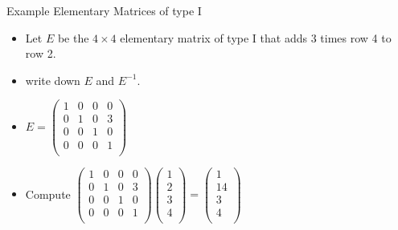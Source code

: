\documentclass{beamer}
\begin{document}
\begin{frame}{Example Elementary Matrices of type I}

\begin{itemize}
\item Let $E$ be the $4\times 4$ elementary matrix of type I that adds 3 times row 4 to row 2.
\item write down $E$ and $E^{-1}$.
\item
$
E=
\begin{pmatrix}
1 & 0 & 0 & 0 \\
0 & 1 & 0 & 3 \\
0 & 0 & 1 & 0 \\
0 & 0 & 0 & 1 \\
\end{pmatrix}
$
\item
Compute
$
\begin{pmatrix}
1 & 0 & 0 & 0 \\
0 & 1 & 0 & 3 \\
0 & 0 & 1 & 0 \\
0 & 0 & 0 & 1 \\
\end{pmatrix}
\begin{pmatrix}
1  \\
2  \\
3  \\
4  \\
\end{pmatrix}
=
\begin{pmatrix}
1  \\
14  \\
3  \\
4  \\
\end{pmatrix}
$
\end{itemize}
\end{frame}
\end{document}
